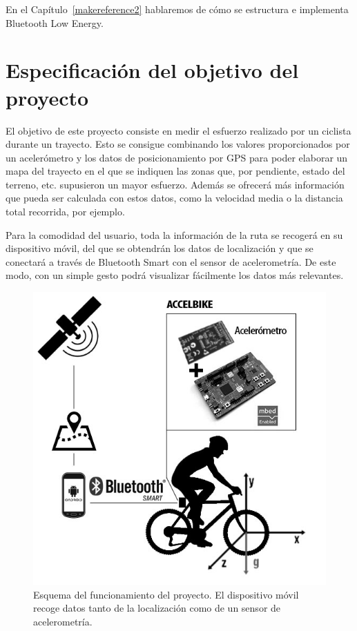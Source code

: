 En el Capítulo~\ref{makereference2} hablaremos de cómo se estructura e implementa Bluetooth Low Energy. 

\section{Especificación del objetivo del proyecto}
\label{makereference1.3}

El objetivo de este proyecto consiste en medir el esfuerzo realizado por un ciclista durante un trayecto. Esto se consigue combinando los valores proporcionados por un acelerómetro y los datos de posicionamiento por GPS para poder elaborar un mapa del trayecto en el que se indiquen las zonas que, por pendiente, estado del terreno, etc. supusieron un mayor esfuerzo. Además se ofrecerá más información que pueda ser calculada con estos datos, como la velocidad media o la distancia total recorrida, por ejemplo.

Para la comodidad del usuario, toda la información de la ruta se recogerá en su dispositivo móvil, del que se obtendrán los datos de localización y que se conectará a través de Bluetooth Smart con el sensor de acelerometría. De este modo, con un simple gesto podrá visualizar fácilmente los datos más relevantes.

\begin{figure}[h]%
	\centering
    \includegraphics[scale=0.5]{figures/esquema_accelbike.jpg}
    \caption[Esquema del funcionamiento del proyecto]{Esquema del funcionamiento del proyecto. El dispositivo móvil recoge datos tanto de la localización como de un sensor de acelerometría.}
   	\label{figuraEsquemaAccelbike}
\end{figure}

